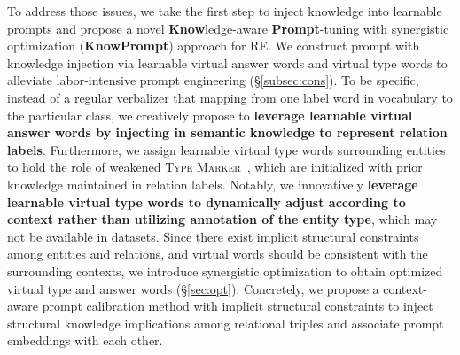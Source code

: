 \documentclass[sigconf]{acmart}
\begin{document}
To address those issues, we take the first step to inject knowledge into learnable prompts and propose a novel \textbf{Know}ledge-aware \textbf{Prompt}-tuning with synergistic optimization (\textbf{KnowPrompt}) approach for RE.  
We construct prompt with knowledge injection via learnable virtual answer words and virtual type words to alleviate labor-intensive prompt engineering (\S \ref{subsec:cons}).  
To be specific, instead of a regular verbalizer that mapping from one label word in vocabulary to the particular class,
we creatively propose to \textbf{leverage learnable virtual answer words by injecting in semantic knowledge to represent relation labels}.
Furthermore, we assign learnable virtual type words surrounding entities to hold the role of weakened \textsc{Type Marker}~\cite{DBLP:journals/corr/abs-2102-01373}, which are initialized with prior knowledge maintained in relation labels. 
Notably, we innovatively \textbf{leverage learnable virtual type words to dynamically adjust according to context rather than utilizing annotation of the entity type}, which may not be available in datasets.
Since there exist implicit structural constraints among entities and relations, and virtual words should be consistent with the surrounding contexts, we introduce synergistic optimization to obtain optimized virtual type and answer words (\S \ref{sec:opt}). 
Concretely, we propose a context-aware prompt calibration method with implicit structural constraints to inject structural knowledge implications among relational triples and associate prompt embeddings with each other. 
\iffalse
We conclude our contributions as follows:

\begin{itemize}
\item We propose a novel knowledge-aware prompt-tuning (KnowPrompt) approach for RE that injects latent knowledge contained in relation labels into prompt template design and answer construction. Concretly, we
fully excavate  the semantic knowledge and prior knowledge among relation labels to participate in prompt construction. 

\item Compared with manually designing templates and individual label words for all classes, we propose the innovation of virtual type words and answer words and synergistically optimize their representation with knowledge constraints, making the prompt learning for RE more efficient and straightforward. To the best of our knowledge, it is the first approach to jointly optimize the prompt template and answer words in continuous space. 

\item We conduct extensive experiments on various popular benchmarks of RE benchmark (both in general and dialogue domain). Sufficient experimental results illustrate the effectiveness of {\ours} in both standard supervised and low-resource settings.
\end{itemize}
\fi
\end{document}
